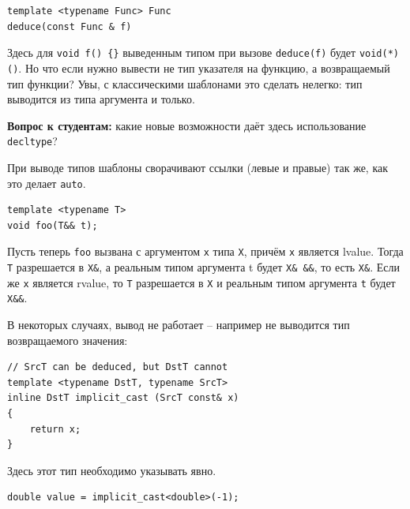 \documentclass[a4paper,12pt,oneside]{book}
\newif\ifanswers
\begin{document}
\begin{lstlisting}
template <typename Func> Func 
deduce(const Func & f)
\end{lstlisting}

Здесь для \lstinline!void f() {}! выведенным типом при вызове \lstinline!deduce(f)! будет \lstinline!void(*)()!. Но что если нужно вывести не тип указателя на функцию, а возвращаемый тип функции? Увы, с классическими шаблонами это сделать нелегко: тип выводится из типа аргумента и только. 

\textbf{Вопрос к студентам:} какие новые возможности даёт здесь использование \lstinline!decltype!?

\ifanswers
Правильный ответ: способ довольно очевиден.

\begin{lstlisting}
template <typename Func>
auto deduce(const Func & f) -> decltype(f())
\end{lstlisting}

В данном случае типом возвращаемого значения для \lstinline!deduce(f)! будет \lstinline!void!
\fi 

При выводе типов шаблоны сворачивают ссылки (левые и правые) так же, как это делает \lstinline!auto!.

\begin{lstlisting}
template <typename T>
void foo(T&& t);
\end{lstlisting}

Пусть теперь \lstinline!foo! вызвана с аргументом \lstinline!x! типа \lstinline!X!, причём \lstinline!x! является lvalue. Тогда \lstinline!T! разрешается в \lstinline!X&!, а реальным типом аргумента t будет \lstinline!X& &&!, то есть \lstinline!X&!. Если же \lstinline!x! является rvalue, то \lstinline!T! разрешается в \lstinline!X! и реальным типом аргумента \lstinline!t! будет \lstinline!X&&!.

В некоторых случаях, вывод не работает -- например не выводится тип возвращаемого значения:

\begin{lstlisting}
// SrcT can be deduced, but DstT cannot 
template <typename DstT, typename SrcT> 
inline DstT implicit_cast (SrcT const& x)  
{ 
    return x; 
} 
\end{lstlisting}

Здесь этот тип необходимо указывать явно.

\begin{lstlisting}
double value = implicit_cast<double>(-1); 
\end{lstlisting}
\end{document}
